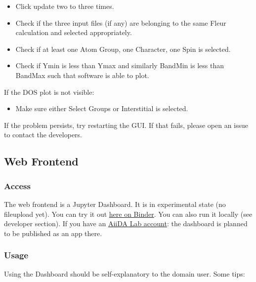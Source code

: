 \begin{itemize}
    \tightlist
\item
    Click update two to three times.
\item
    Check if the three input files (if any) are belonging to the same
    Fleur calculation and selected appropriately.
\item
    Check if at least one Atom Group, one Character, one Spin is selected.
\item
    Check if Ymin is less than Ymax and similarly BandMin is less than
    BandMax such that software is able to plot.
\end{itemize}

If the DOS plot is not visible:

\begin{itemize}
    \tightlist
\item Make sure either Select Groups or Interstitial is selected.
\end{itemize}

If the problem persists, try restarting the GUI. If that fails, please open an
issue to contact the developers.

\subsection{Web Frontend}\label{web-frontend}

\subsubsection{Access}\label{access}

The web frontend is a Jupyter Dashboard. It is in experimental state (no
fileupload yet). You can try it out
\href{https://mybinder.org/v2/gh/JuDFTteam/masci-tools/studentproject18ws?filepath=studentproject18w\%2Ffrontend\%2Fjupyter\%2Fdemo\%2Fbinder_demo.ipynb}{here
  on Binder}. You can also run it locally (see developer section). If you have an
\href{https://aiidalab.materialscloud.org/hub/login}{AiiDA Lab account}: the
dashboard is planned to be published as an app there.

\subsubsection{Usage}\label{usage-1}

Using the Dashboard should be self-explanatory to the domain user. Some
tips:

